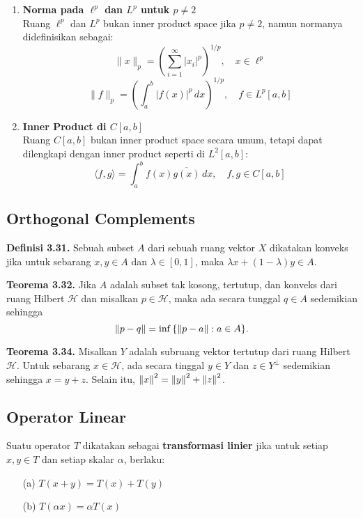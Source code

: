 \documentclass{article}
\begin{document}
\begin{multicols}{2}
\begin{enumerate}
    \item \textbf{Norma pada \( \ell^p \) dan \( L^p \) untuk \( p \ne 2 \)}\\
          Ruang \( \ell^p \) dan \( L^p \) bukan inner product space jika \( p \ne 2 \), namun normanya didefinisikan sebagai:
          \[
            \|x\|_p = \left( \sum_{i=1}^{\infty} |x_i|^p \right)^{1/p}, \quad x \in \ell^p
          \]
          \[
            \|f\|_p = \left( \int_a^b |f(x)|^p \, dx \right)^{1/p}, \quad f \in L^p[a,b]
          \]

    \item \textbf{Inner Product di \( C[a,b] \)}\\
          Ruang \( C[a,b] \) bukan inner product space secara umum, tetapi dapat dilengkapi dengan inner product seperti di \( L^2[a,b] \):
          \[
            \langle f, g \rangle = \int_a^b f(x) \overline{g(x)} \, dx, \quad f, g \in C[a,b]
          \]
  \end{enumerate}
  \subsection*{Orthogonal Complements}
  \vspace{-1em}
  \textbf{Definisi 3.31.} Sebuah subset \(A\) dari sebuah ruang vektor \(X\) dikatakan konveks jika untuk sebarang \(x,y \in A\) dan \(\lambda\in [0,1]\), maka \(\lambda x + (1- \lambda)y \in A\).

  \textbf{Teorema 3.32.} Jika \(A\) adalah subset tak kosong, tertutup, dan konveks dari ruang Hilbert \(\mathcal{H}\) dan misalkan \(p \in \mathcal{H}\), maka ada secara tunggal \(q \in A\) sedemikian sehingga
  \begin{equation*}
    \norm{p-q} = \inf\qty{\norm{p-a}: a\in A}.
  \end{equation*}

  \textbf{Teorema 3.34.} Misalkan \(Y\) adalah subruang vektor tertutup dari ruang Hilbert \(\mathcal{H}\). Untuk sebarang \(x \in \mathcal{H}\), ada secara tinggal \(y \in Y\) dan \(z \in Y^\perp\) sedemikian sehingga \(x = y + z\). Selain itu, \(\norm{x}^2 = \norm{y}^2 + \norm{z}^2\).
  \subsection*{Operator Linear}
  Suatu operator $T$ dikatakan sebagai \textbf{transformasi linier} jika untuk setiap $x, y \in T$ dan setiap skalar $\alpha$, berlaku:
  \begin{itemize}
    \item [(a)] $T(x + y) = T(x) + T(y)$
    \item [(b)] $T(\alpha x) = \alpha T(x)$
  \end{itemize}
  \vspace{-1em}

\end{multicols}
\end{document}

